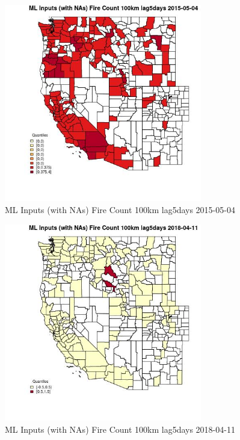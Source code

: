 \begin{figure} 
\centering  
\includegraphics[width=0.77\textwidth]{Code_Outputs/Report_ML_input_PM25_Step4_part_e_de_duplicated_aves_compiled_2019-05-18wNAs_CountyFire_Count_100km_lag5daysMean2015-05-04_2015-05-04.jpg} 
\caption{\label{fig:Report_ML_input_PM25_Step4_part_e_de_duplicated_aves_compiled_2019-05-18wNAsCountyFire_Count_100km_lag5daysMean2015-05-04_2015-05-04}ML Inputs (with NAs) Fire Count 100km lag5days 2015-05-04} 
\end{figure} 
 

\begin{figure} 
\centering  
\includegraphics[width=0.77\textwidth]{Code_Outputs/Report_ML_input_PM25_Step4_part_e_de_duplicated_aves_compiled_2019-05-18wNAs_CountyFire_Count_100km_lag5daysMean2018-04-11_2018-04-11.jpg} 
\caption{\label{fig:Report_ML_input_PM25_Step4_part_e_de_duplicated_aves_compiled_2019-05-18wNAsCountyFire_Count_100km_lag5daysMean2018-04-11_2018-04-11}ML Inputs (with NAs) Fire Count 100km lag5days 2018-04-11} 
\end{figure} 
 

